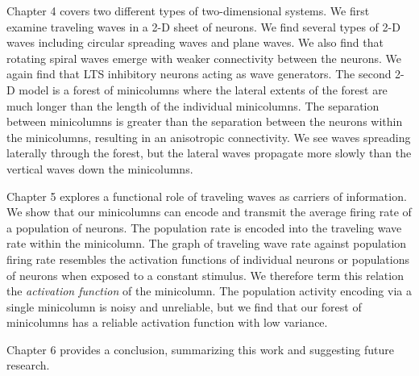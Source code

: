 Chapter 4 covers two different types of two-dimensional systems.
We first examine traveling waves in a 2-D sheet of neurons.
We find several types of 2-D waves including circular spreading waves and plane waves.
We also find that rotating spiral waves emerge with weaker connectivity between the neurons.
We again find that LTS inhibitory neurons acting as wave generators.
The second 2-D model is a forest of minicolumns where the lateral extents of the forest are much longer than the length of the individual minicolumns.
The separation between minicolumns is greater than the separation between the neurons within the minicolumns,
resulting in an anisotropic connectivity.
We see waves spreading laterally through the forest, but the lateral waves propagate more slowly than the vertical waves down the minicolumns.

Chapter 5 explores a functional role of traveling waves as carriers of information.
We show that our minicolumns can encode and transmit the average firing rate of a population of neurons.
The population rate is encoded into the traveling wave rate within the minicolumn.
The graph of traveling wave rate against population firing rate resembles the activation functions of individual neurons or 
populations of neurons when exposed to a constant stimulus.
We therefore term this relation the \textit{activation function} of the minicolumn.
The population activity encoding via a single minicolumn is noisy and unreliable,
but we find that our forest of minicolumns has a reliable activation function with low variance.

Chapter 6 provides a conclusion, summarizing this work and suggesting future research.


\endinput
